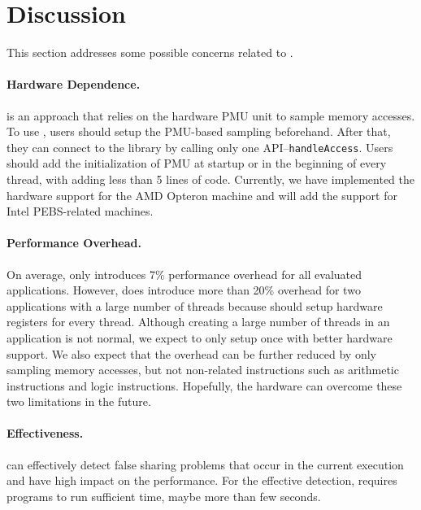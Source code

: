 \section{Discussion}

\label{sec:discuss}

This section addresses some possible concerns related to \Cheetah{}. 

\paragraph{Hardware Dependence.} \cheetah{} is an approach that relies on the hardware PMU unit to sample memory accesses. To use \cheetah{}, users should setup the PMU-based sampling beforehand. After that, they can connect to the \cheetah{} library by calling only one API--\texttt{handleAccess}. Users should add the initialization of PMU at startup or in the beginning of every thread, with adding less than 5 lines of code. Currently, we have implemented the hardware support for the AMD Opteron machine and will add the support for Intel PEBS-related machines. 

\paragraph{Performance Overhead.} On average, \Cheetah{} only introduces 7\% performance overhead for all evaluated applications. However, \cheetah{} does introduce more than 20\% overhead for two applications with a large number of threads because \cheetah{} should setup hardware registers for every thread. Although creating a large number of threads in an application is not normal, we expect to only setup once with better hardware support. We also expect that the overhead can be further reduced by only sampling memory accesses, but not non-related instructions such as arithmetic instructions and logic instructions. Hopefully, the hardware can overcome these two limitations in the future.

\paragraph{Effectiveness.} \Cheetah{} can effectively detect false sharing problems that occur in the current execution and have high impact on the performance. For the effective detection, \Cheetah{} requires programs to run sufficient time, maybe more than few seconds. 
